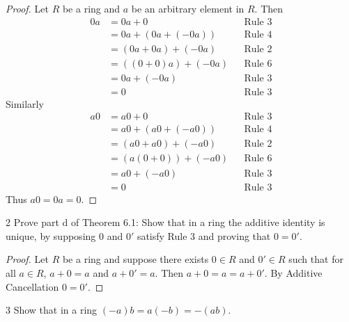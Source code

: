 \begin{proof}
    Let $R$ be a ring and $a$ be an arbitrary element in $R$.
    Then
    \begin{align*}
        0a &= 0a + 0 &&\text{Rule 3} \\
            &= 0a + (0a + (-0a)) &&\text{Rule 4} \\
            &= (0a + 0a) + (-0a) &&\text{Rule 2} \\
            &= ((0 + 0)a) + (-0a) &&\text{Rule 6} \\
            &= 0a + (-0a) &&\text{Rule 3} \\
            &= 0 &&\text{Rule 3}
    \end{align*}
    Similarly 
    \begin{align*}
        a0 &= a0 + 0 &&\text{Rule 3} \\
            &= a0 + (a0 + (-a0)) &&\text{Rule 4} \\
            &= (a0 + a0) + (-a0) &&\text{Rule 2} \\
            &= (a(0 + 0)) + (-a0) &&\text{Rule 6} \\
            &= a0 + (-a0) &&\text{Rule 3} \\
            &= 0 &&\text{Rule 3}
    \end{align*}
    Thus $a0 = 0a = 0$.
\end{proof}

\begin{problem}{2}
    Prove part d of Theorem 6.1:
    Show that in a ring the additive identity is unique,
        by supposing $0$ and $0'$ satisfy Rule 3
        and proving that $0 = 0'$.
\end{problem}
\solved

\begin{proof}
    Let $R$ be a ring and suppose there exists $0 \in R$
        and $0' \in R$ such that 
        for all $a \in R$, $a + 0 = a$ and $a + 0' = a$.
    Then $a + 0 = a = a + 0'$.
    By Additive Cancellation $0 = 0'$.
\end{proof}

\begin{problem}{3}
    Show that in a ring $(-a)b = a(-b) = -(ab)$.
\end{problem}
\solved

